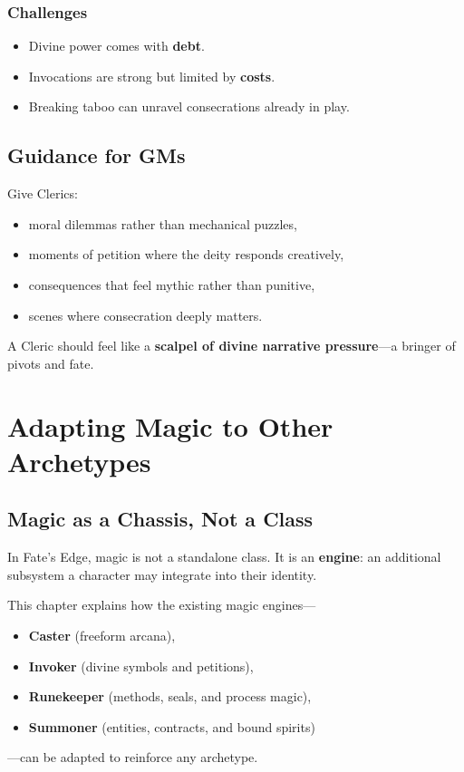 \documentclass[11pt]{book}
\begin{document}
\subsection{Challenges}
\begin{itemize}
  \item Divine power comes with \textbf{debt}.  
  \item Invocations are strong but limited by \textbf{costs}.  
  \item Breaking taboo can unravel consecrations already in play.
\end{itemize}

\section{Guidance for GMs}
Give Clerics:
\begin{itemize}
  \item moral dilemmas rather than mechanical puzzles,
  \item moments of petition where the deity responds creatively,
  \item consequences that feel mythic rather than punitive,
  \item scenes where consecration deeply matters.
\end{itemize}
A Cleric should feel like a \textbf{scalpel of divine narrative pressure}---a bringer of pivots and fate.


\chapter{Adapting Magic to Other Archetypes}
\label{chap:magic-archetype-adaptation}

\section{Magic as a Chassis, Not a Class}
In Fate's Edge, magic is not a standalone class.  
It is an \textbf{engine}: an additional subsystem a character may integrate into their identity.

This chapter explains how the existing magic engines---
\begin{itemize}
  \item \textbf{Caster} (freeform arcana),
  \item \textbf{Invoker} (divine symbols and petitions),
  \item \textbf{Runekeeper} (methods, seals, and process magic),
  \item \textbf{Summoner} (entities, contracts, and bound spirits)
\end{itemize}
---can be adapted to reinforce any archetype.
\end{document}
